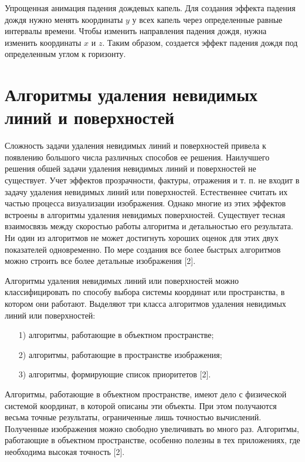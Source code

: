 Упрощенная анимация падения дождевых капель. 
Для создания эффекта падения дождя нужно менять координаты $y$ у всех капель через определенные равные интервалы времени.
Чтобы изменить направления падения дождя, нужна изменить координаты $x$ и $z$. 
Таким образом, создается эффект падения дождя под определенным углом к горизонту.

\section{Алгоритмы удаления невидимых линий и поверхностей}
\label{sec:z_buffer}

Сложность задачи удаления невидимых линий и поверхностей привела к появлению большого числа различных способов ее решения. 
Наилучшего решения обшей задачи удаления невидимых линий и поверхностей не существует. 
Учет эффектов прозрачности, фактуры, отражения и т. п. не входит в задачу удаления невидимых линий или поверхностей. 
Естественнее считать их частью процесса визуализации изображения. 
Однако многие из этих эффектов встроены в алгоритмы удаления невидимых поверхностей. 
Существует тесная взаимосвязь между скоростью работы алгоритма и детальностью его результата. 
Ни один из алгоритмов не может достигнуть хороших оценок для этих двух показателей одновременно. 
По мере создания все более быстрых алгоритмов можно строить все более детальные изображения [2].

Алгоритмы удаления невидимых линий или поверхностей можно классифицировать по способу выбора системы координат или пространства, в котором они работают. Выделяют три класса алгоритмов удаления невидимых линий или поверхностей:

\begin{enumerate}
\item[1)]
алгоритмы, работающие в объектном пространстве;
\item[2)]
алгоритмы, работающие в пространстве изображения;
\item[3)]
алгоритмы, формирующие список приоритетов [2].
\end{enumerate}

Алгоритмы, работающие в объектном пространстве, имеют дело с физической системой координат, в которой описаны эти объекты. 
При этом получаются весьма точные результаты, ограниченные лишь точностью вычислений. 
Полученные изображения можно свободно увеличивать во много раз. 
Алгоритмы, работающие в объектном пространстве, особенно полезны в тех приложениях, где необходима высокая точность [2].

